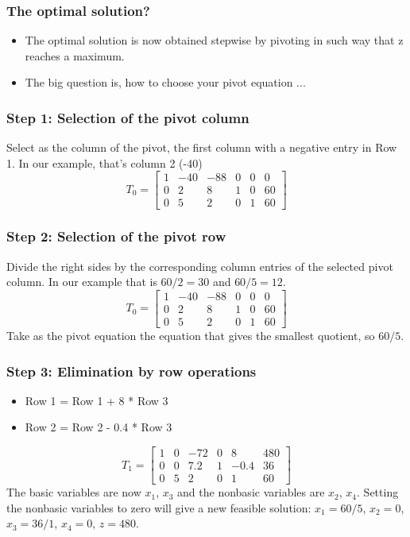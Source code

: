 \documentclass[11pt,table,final,fleqn,xcolor={usenames,dvipsnames,table}]{beamer}
\begin{document}
\begin{frame}
  \frametitle{The optimal solution?}
  \begin{itemize}
    \item The optimal solution is now obtained stepwise by pivoting in such way that z reaches a maximum. 
    \item The big question is, how to choose your pivot equation ...
  \end{itemize}
\end{frame}

\begin{frame}
  \frametitle{Step 1: Selection of the pivot column}
  Select as the column of the pivot, the first column with a negative entry in Row 1. In our example, that’s column 2 (-40)
     \[
T_0 = \begin{bmatrix}
1 & -40 & -88 & 0 & 0 & 0\\ 
0 & 2 & 8 & 1 & 0 & 60\\
0 & 5 & 2 & 0 & 1 &60 
\end{bmatrix}
   \]
\end{frame}

\begin{frame}
  \frametitle{Step 2: Selection of the pivot row}
  Divide the right sides by the corresponding column entries of the selected pivot column. In our example that is $60/2 = 30$ and $60/5 = 12$.
     \[
T_0 = \begin{bmatrix}
1 & -40 & -88 & 0 & 0 & 0\\ 
0 & 2 & 8 & 1 & 0 & 60\\
0 & 5 & 2 & 0 & 1 &60 
\end{bmatrix}
   \]
   Take as the pivot equation the equation that gives the smallest quotient, so $60/5$.
\end{frame}

\begin{frame}
  \frametitle{Step 3: Elimination by row operations}
  \begin{itemize}
    \item Row 1 = Row 1 + 8 * Row 3
    \item Row 2 = Row 2 - 0.4 * Row 3
  \end{itemize}
     \[
T_1 = \begin{bmatrix}
1 & 0 & -72 & 0 & 8 & 480\\ 
0 & 0 & 7.2 & 1 & -0.4 & 36\\
0 & 5 & 2 & 0 & 1 &60 
\end{bmatrix}
   \]
   The basic variables are now $x_1$, $x_3$ and the nonbasic variables are $x_2$, $x_4$. Setting the nonbasic variables to zero will give a new feasible solution: $x_1 = 60/5$, $x_2 = 0$, $x_3 = 36/1$, $x_4 = 0$, $z =480$.
\end{frame}
\end{document}

